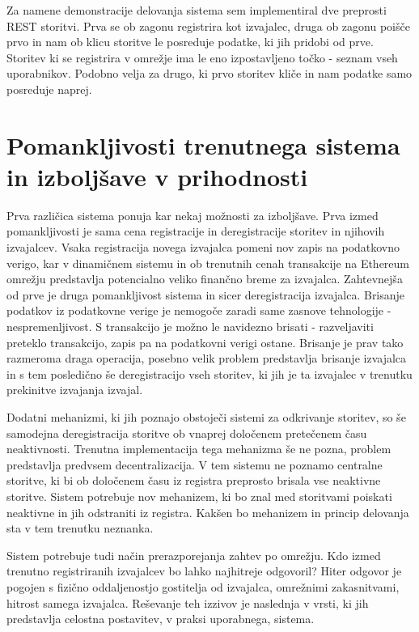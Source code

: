 \documentclass[a4paper, 12pt]{book}
\begin{document}
Za namene demonstracije delovanja sistema sem implementiral dve preprosti REST storitvi.
Prva se ob zagonu registrira kot izvajalec, druga ob zagonu poišče prvo in nam ob klicu storitve le posreduje podatke, ki jih pridobi od prve.
Storitev ki se registrira v omrežje ima le eno izpostavljeno točko - seznam vseh uporabnikov.
Podobno velja za drugo, ki prvo storitev kliče in nam podatke samo posreduje naprej.

\section{Pomankljivosti trenutnega sistema in izboljšave v prihodnosti}

Prva različica sistema ponuja kar nekaj možnosti za izboljšave.
Prva izmed pomankljivosti je sama cena registracije in deregistracije storitev in njihovih izvajalcev.
Vsaka registracija novega izvajalca pomeni nov zapis na podatkovno verigo, kar v dinamičnem sistemu in ob trenutnih cenah transakcije na Ethereum omrežju predstavlja potencialno veliko finančno breme za izvajalca.
Zahtevnejša od prve je druga pomankljivost sistema in sicer deregistracija izvajalca.
Brisanje podatkov iz podatkovne verige je nemogoče zaradi same zasnove tehnologije - nespremenljivost.
S transakcijo je možno le navidezno brisati - razveljaviti preteklo transakcijo, zapis pa na podatkovni verigi ostane.
Brisanje je prav tako razmeroma draga operacija, posebno velik problem predstavlja brisanje izvajalca in s tem posledično še deregistracijo vseh storitev, ki jih je ta izvajalec v trenutku prekinitve izvajanja izvajal.

Dodatni mehanizmi, ki jih poznajo obstoječi sistemi za odkrivanje storitev, so še samodejna deregistracija storitve ob vnaprej določenem pretečenem času neaktivnosti.
Trenutna implementacija tega mehanizma še ne pozna, problem predstavlja predvsem decentralizacija.
V tem sistemu ne poznamo centralne storitve, ki bi ob določenem času iz registra preprosto brisala vse neaktivne storitve.
Sistem potrebuje nov mehanizem, ki bo znal med storitvami poiskati neaktivne in jih odstraniti iz registra. Kakšen bo mehanizem in princip delovanja sta v tem trenutku neznanka.

Sistem potrebuje tudi način prerazporejanja zahtev po omrežju.
Kdo izmed trenutno registriranih izvajalcev bo lahko najhitreje odgovoril?
Hiter odgovor je pogojen s fizično oddaljenostjo gostitelja od izvajalca, omrežnimi zakasnitvami, hitrost samega izvajalca. Reševanje teh izzivov je naslednja v vrsti, ki jih predstavlja celostna postavitev, v praksi uporabnega, sistema.
\end{document}
